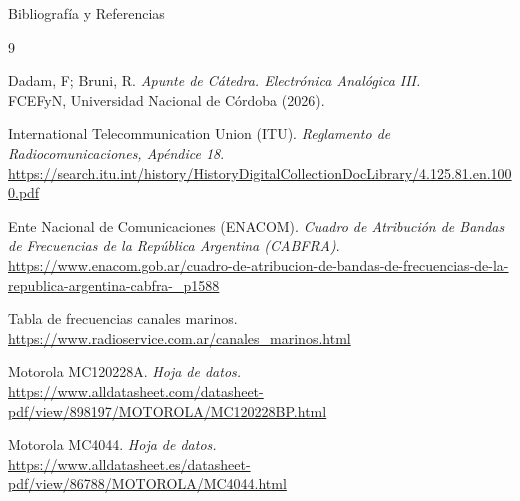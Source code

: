 \documentclass[10pt]{beamer}
\begin{document}
\begin{frame}[allowframebreaks]{Bibliografía y Referencias}
    \begin{thebibliography}{9}

        Dadam, F; Bruni, R. \textit{Apunte de Cátedra. Electrónica Analógica III.}
        \\ {\scriptsize FCEFyN, Universidad Nacional de Córdoba (2026).}

        \vspace{0.1 cm}

        International Telecommunication Union (ITU).
        \textit{Reglamento de Radiocomunicaciones, Apéndice 18}. 
        \\ {\scriptsize \url{https://search.itu.int/history/HistoryDigitalCollectionDocLibrary/4.125.81.en.1000.pdf}}

        \vspace{0.1 cm}

        Ente Nacional de Comunicaciones (ENACOM). 
        \textit{Cuadro de Atribución de Bandas de Frecuencias de la República Argentina (CABFRA)}.
        \\ {\scriptsize \url{https://www.enacom.gob.ar/cuadro-de-atribucion-de-bandas-de-frecuencias-de-la-republica-argentina-cabfra-_p1588}}

        \vspace{0.1 cm}

        Tabla de frecuencias canales marinos.
        \\ {\scriptsize \url{https://www.radioservice.com.ar/canales_marinos.html}}
        
        \vspace{0.1 cm}

        Motorola MC120228A. \textit{Hoja de datos.}
        \\ {\scriptsize \url{https://www.alldatasheet.com/datasheet-pdf/view/898197/MOTOROLA/MC120228BP.html}}

        \vspace{0.1 cm}

        Motorola MC4044. \textit{Hoja de datos.}
        \\ {\scriptsize \url{https://www.alldatasheet.es/datasheet-pdf/view/86788/MOTOROLA/MC4044.html}}

        \vspace{0.1 cm}


\end{thebibliography}
\end{frame}
\end{document}
